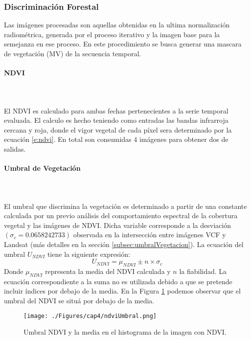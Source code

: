 \subsubsection{Discriminaci\'on Forestal}
Las im\'agenes procesadas son aquellas obtenidas en la ultima normalizaci\'on radiom\'etrica, generada por el proceso iterativo y la imagen base para la semejanza en ese proceso. En este procedimiento se busca generar una mascara de vegetaci\'on (MV) de la secuencia temporal.
\paragraph{NDVI}\mbox{}\\\mbox{}\\
El NDVI es calculado para ambas fechas pertenecientes a la serie temporal evaluada. El calculo es hecho teniendo como entradas las bandas infrarroja cercana y roja, donde el vigor vegetal de cada p\'ixel sera determinado por la ecuaci\'on \ref{e:ndvi}. En total son consumidas 4 im\'agenes para obtener dos de salidas.
\paragraph{Umbral de Vegetaci\'on}\label{sec:uvegetacion}\mbox{}\\\mbox{}\\
El umbral que discrimina la vegetaci\'on es determinado a partir de una constante calculada por un previo an\'alisis del comportamiento espectral de la cobertura vegetal y las im\'agenes de NDVI. Dicha variable corresponde a la desviaci\'on $(\sigma_{c} = 0.0658242733)  $ observada en la intersecci\'on entre im\'agenes VCF y Landsat (m\'as detalles en la secci\'on \ref{subsec:umbralVegetacion}). La ecuaci\'on del umbral $ U_{NDVI} $ tiene la siguiente expresi\'on:
		\begin{equation}
		U_{NDVI} = \mu_{NDVI}\pm n \times \sigma_{c}
		\end{equation}
Donde $ \mu_{NDVI} $ representa la media del NDVI calculada y $ n $ la fiabilidad. La ecuaci\'on correspondiente a la suma no es utilizada debido a que se pretende incluir \'indices por debajo de la media. En la Figura \ref{fig:ndviUmbral} podemos observar que el umbral del NDVI se situ\'a por debajo de la media.
\begin{figure}[H]
	\centering
	\texttt{[image: ./Figures/cap4/ndviUmbral.png]}
	\caption{Umbral NDVI y la media en el histograma de la imagen con NDVI.}
	\label{fig:ndviUmbral}
\end{figure}

